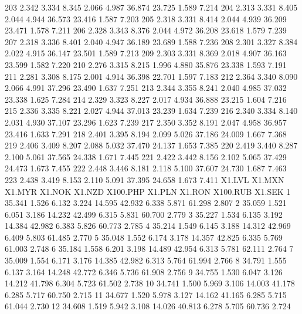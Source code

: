 \documentclass[a4paper,11pt]{scrartcl}
\begin{document}
\begin{Schunk}
\begin{Soutput}
203  2.342  3.334    8.345     2.066  4.987   36.874   23.725    1.589  7.214
204  2.313  3.331    8.405     2.044  4.944   36.573   23.416    1.587  7.203
205  2.318  3.331    8.414     2.044  4.939   36.209   23.471    1.578  7.211
206  2.328  3.343    8.376     2.044  4.972   36.208   23.618    1.579  7.239
207  2.318  3.336    8.401     2.040  4.947   36.189   23.689    1.588  7.236
208  2.301  3.327    8.384     2.022  4.915   36.147   23.501    1.589  7.213
209  2.303  3.331    8.369     2.018  4.907   36.163   23.599    1.582  7.220
210  2.276  3.315    8.215     1.996  4.880   35.876   23.338    1.593  7.191
211  2.281  3.308    8.175     2.001  4.914   36.398   22.701    1.597  7.183
212  2.364  3.340    8.090     2.066  4.991   37.296   23.490    1.637  7.251
213  2.344  3.355    8.241     2.040  4.985   37.032   23.338    1.625  7.284
214  2.329  3.323    8.227     2.017  4.934   36.888   23.215    1.604  7.216
215  2.336  3.335    8.221     2.027  4.944   37.013   23.239    1.634  7.239
216  2.340  3.334    8.140     2.031  4.930   37.107   23.296    1.623  7.239
217  2.350  3.352    8.191     2.047  4.958   36.957   23.416    1.633  7.291
218  2.401  3.395    8.194     2.099  5.026   37.186   24.009    1.667  7.368
219  2.406  3.409    8.207     2.088  5.032   37.470   24.137    1.653  7.385
220  2.419  3.440    8.287     2.100  5.061   37.565   24.338    1.671  7.445
221  2.422  3.442    8.156     2.102  5.065   37.429   24.473    1.673  7.455
222  2.448  3.446    8.181     2.118  5.100   37.607   24.730    1.687  7.463
223  2.438  3.419    8.153     2.110  5.091   37.395   24.658    1.673  7.411
    X1.LVL X1.MXN X1.MYR X1.NOK X1.NZD X100.PHP X1.PLN X1.RON X100.RUB X1.SEK
1   35.341  1.526  6.132  3.224 14.595   42.932  6.338  5.871   61.298  2.807
2   35.059  1.521  6.051  3.186 14.232   42.499  6.315  5.831   60.700  2.779
3   35.227  1.534  6.135  3.192 14.384   42.982  6.383  5.826   60.773  2.785
4   35.214  1.549  6.145  3.188 14.312   42.969  6.409  5.803   61.485  2.770
5   35.048  1.552  6.174  3.178 14.357   42.825  6.335  5.769   61.003  2.748
6   35.184  1.558  6.201  3.198 14.489   42.954  6.313  5.781   62.111  2.764
7   35.009  1.554  6.171  3.176 14.385   42.982  6.313  5.764   61.994  2.766
8   34.791  1.555  6.137  3.164 14.248   42.772  6.346  5.736   61.908  2.756
9   34.755  1.530  6.047  3.126 14.212   41.798  6.304  5.723   61.502  2.738
10  34.741  1.500  5.969  3.106 14.003   41.178  6.285  5.717   60.750  2.715
11  34.677  1.520  5.978  3.127 14.162   41.165  6.285  5.715   61.044  2.730
12  34.608  1.519  5.942  3.108 14.026   40.813  6.278  5.705   60.736  2.724

\end{Soutput}
\end{Schunk}
\end{document}

